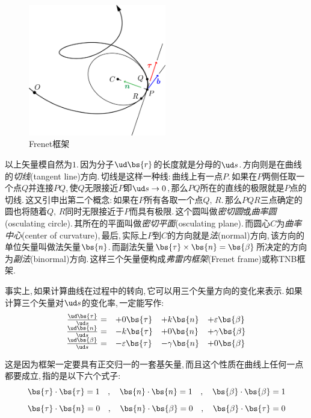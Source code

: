 \begin{figure}\label{6-1-7}
\vspace{-0.2cm}
\centering
\includegraphics[width=6cm]{image/6-1-7.png}
\caption{Frenet框架}
\end{figure}
以上矢量模自然为$1$.\,因为分子$\ud \bs{r}$的长度就是分母的$\ud s$.\,方向则是在曲线的\emph{切线}(tangent line)方向.\,切线是这样一种线:\,曲线上有一点$P$.\,如果在$P$两侧任取一个点$Q$并连接$PQ$,\,使$Q$无限接近$P$即$\ud s \to 0$,\,那么$PQ$所在的直线的极限就是$P$点的切线.\,这又引申出第二个概念:\,如果在$P$所有各取一个点$Q,\,R$.\,那么$PQR$三点确定的圆也将随着$Q,\,R$同时无限接近于$P$而具有极限.\,这个圆叫做\emph{密切圆}或\emph{曲率圆}(osculating circle).\,其所在的平面叫做\emph{密切平面}(osculating plane).\,而圆心$C$为\emph{曲率中心}(center of curvature),\,最后,\,实际上$P$到$C$的方向就是\emph{法}(normal)方向,\,该方向的单位矢量叫做法矢量$\bs{n}$.\,而副法矢量$\bs{\tau}\times\bs{n}=\bs{\beta}$所决定的方向为\emph{副法}(binormal)方向.\,这样三个矢量便构成\emph{弗雷内框架}(Frenet frame)或称TNB框架.

事实上,\,如果计算曲线在过程中的转向,\,它可以用三个矢量方向的变化来表示.\,如果计算三个矢量对$\ud s$的变化率,\,一定能写作:
\[\begin{array}{rlll}
\frac{\ud \bs{\tau}}{\ud s}=		&	+0\bs{\tau} 	&	+k\bs{n} 		& +\varepsilon\bs{\beta}\\
\frac{\ud \bs{n}}{\ud s}=		&	-k\bs{\tau} 	&	+0\bs{n} 		& +\gamma\bs{\beta}\\
\frac{\ud \bs{\beta}}{\ud s}=		&	-\varepsilon\bs{\tau} 	&	-\gamma\bs{n} 		& +0\bs{\beta}
\end{array}\]

这是因为框架一定要具有正交归一的一套基矢量,\,而且这个性质在曲线上任何一点都要成立,\,指的是以下六个式子:
\[\bs{\tau}\cdot\bs{\tau}=1\quad,\quad\bs{n}\cdot\bs{n}=1\quad,\quad \bs{\beta}\cdot\bs{\beta}=1\]
\[\bs{\tau}\cdot\bs{n}=0\quad,\quad\bs{n}\cdot\bs{\beta}=0\quad,\quad \bs{\beta}\cdot\bs{\tau}=0\]

